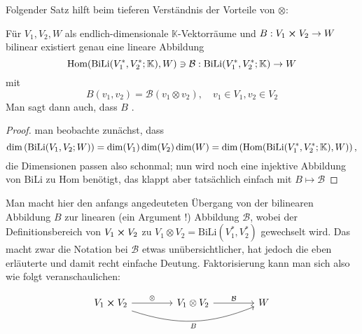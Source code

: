 \documentclass[../H_Analysis_main.tex]{subfiles}
\begin{document}
Folgender Satz hilft beim tieferen Verständnis der Vorteile von $\otimes$:
\begin{satz}
Für $V_1, V_2, W$ als endlich-dimensionale $\mathbb{K}$-Vektorräume und $B: V_1 \cross V_2 \rightarrow W$ bilinear existiert genau eine lineare Abbildung
\begin{equation*}
\text{Hom}\qty(\text{BiLi}(V_1^*, V_2^*; \mathbb{K}), W) \ni \mathcal{B}: \text{BiLi}(V_1^*, V_2^*; \mathbb{K}) \rightarrow W
\end{equation*}
mit
\begin{equation}
B(v_1, v_2) = \mathcal{B}(v_1 \otimes v_2), \quad v_1 \in V_1, v_2 \in V_2
\end{equation}
Man sagt dann auch, dass $B$ .
\end{satz}
\begin{proof}
man beobachte zunächst, dass
\begin{equation*}
\dim\qty(\text{BiLi}(V_1, V_2; W)) = \dim(V_1) \dim(V_2) \dim(W) = \dim\qty(\text{Hom}\qty(\text{BiLi}(V_1^*, V_2^*; \mathbb{K}), W)) \, ,
\end{equation*}
die Dimensionen passen also schonmal; nun wird noch eine injektive Abbildung von BiLi zu Hom benötigt, das klappt aber tatsächlich einfach mit $B \mapsto \mathcal{B}$
\end{proof}

Man macht hier den anfangs angedeuteten Übergang von der bilinearen Abbildung $B$ zur linearen (ein Argument !) Abbildung $\mathcal{B}$, wobei der Definitionsbereich von $V_1 \cross V_2$ zu $V_1 \otimes V_2 = \text{BiLi}(V_1^*, V_2^*)$ gewechselt wird. Das macht zwar die Notation bei $\mathcal{B}$ etwas unübersichtlicher, hat jedoch die eben erläuterte und damit recht einfache Deutung. Faktorisierung kann man sich also wie folgt veranschaulichen:


$$
\begin{tikzcd}[column sep = 42]
V_1 \cross V_2 \arrow[swap, bend right = 20]{rr}{B} \arrow{r}{\otimes} & V_1 \otimes V_2 \arrow{r}{\mathcal{B}} & W
\end{tikzcd}
$$
\end{document}
